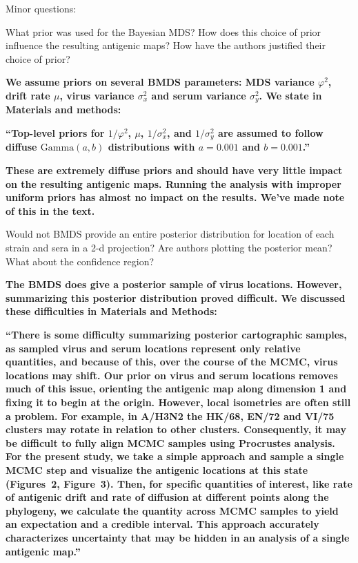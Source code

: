 \documentclass[11pt,oneside,letterpaper]{article}
\newcommand{\mdssd}{\varphi}						%
\newcommand{\virussd}{\sigma_x}						%
\newcommand{\serumsd}{\sigma_y}						%
\newcommand{\drift}{\mu}							%
\begin{document}
Minor questions:

What prior was used for the Bayesian MDS? How does this choice of prior influence the resulting antigenic maps? How have the authors justified their choice of prior?

\textbf{We assume priors on several BMDS parameters: MDS variance $\mdssd^2$, drift rate $\drift$, virus variance $\virussd^2$ and serum variance $\serumsd^2$.  We state in Materials and methods:}

\textbf{``Top-level priors for $1/\mdssd^2$, $\drift$, $1/\virussd^2$, and $1/\serumsd^2$ are assumed to follow diffuse $\mbox{Gamma}(a, b)$ distributions  with $a=0.001$ and $b=0.001$.''}

\textbf{These are extremely diffuse priors and should have very little impact on the resulting antigenic maps.  Running the analysis with improper uniform priors has almost no impact on the results.  We've made note of this in the text.}

Would not BMDS provide an entire posterior distribution for location of each strain and sera in a 2-d projection? Are authors plotting the posterior mean? What about the confidence region?

\textbf{The BMDS does give a posterior sample of virus locations.  However, summarizing this posterior distribution proved difficult.  We discussed these difficulties in Materials and Methods:}

\textbf{``There is some difficulty summarizing posterior cartographic samples, as sampled virus and serum locations represent only relative quantities, and because of this, over the course of the MCMC, virus locations may shift.
Our prior on virus and serum locations removes much of this issue, orienting the antigenic map along dimension 1 and fixing it to begin at the origin.
However, local isometries are often still a problem.
For example, in A/H3N2 the HK/68, EN/72 and VI/75 clusters may rotate in relation to other clusters.
Consequently, it may be difficult to fully align MCMC samples using Procrustes analysis.
For the present study, we take a simple approach and sample a single MCMC step and visualize the antigenic locations at this state (Figures~2, Figure~3).
Then, for specific quantities of interest, like rate of antigenic drift and rate of diffusion at different points along the phylogeny, we calculate the quantity across MCMC samples to yield an expectation and a credible interval.
This approach accurately characterizes uncertainty that may be hidden in an analysis of a single antigenic map.''}
\end{document}
